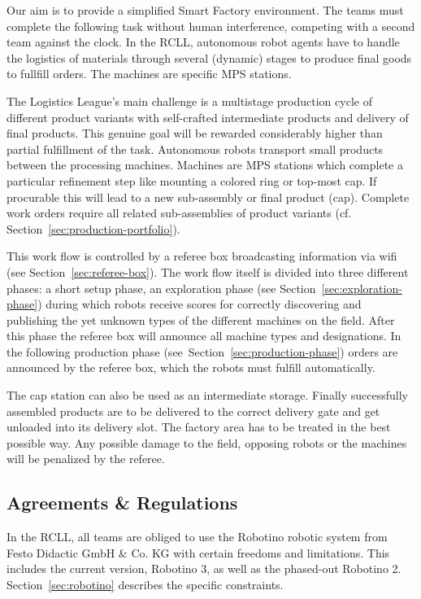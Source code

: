 \documentclass[12pt,twoside]{article}
\newcommand{\refsec}[1]{Section~\ref{#1}}
\begin{document}
Our aim is to provide a simplified Smart Factory environment. The
teams must complete the following task without human interference,
competing with a second team against the clock. In the RCLL,
autonomous robot agents have to handle the logistics of materials
through several (dynamic) stages to produce final goods to fullfill
orders. The machines are specific MPS stations.

The Logistics League's main challenge is a multistage production cycle
of different product variants with self-crafted intermediate products
and delivery of final products. This genuine goal will be rewarded
considerably higher than partial fulfillment of the task. Autonomous
robots transport small products between the processing
machines. Machines are MPS stations which complete a particular
refinement step like mounting a colored ring or top-most cap. If
procurable this will lead to a new sub-assembly or final product
(cap). Complete work orders require all related sub-assemblies of
product variants (cf.  \refsec{sec:production-portfolio}).

This work flow is controlled by a referee box broadcasting information
via wifi (see \refsec{sec:referee-box}). The work flow itself is
divided into three different phases: a short setup phase, an
exploration phase (see \refsec{sec:exploration-phase}) during which
robots receive scores for correctly discovering and publishing the yet
unknown types of the different machines on the field. After this phase
the referee box will announce all machine types and designations. In
the following production phase (see~\refsec{sec:production-phase})
orders are announced by the referee box, which the robots must fulfill
automatically.

The cap station can also be used as an intermediate storage. Finally
successfully assembled products are to be delivered to the correct
delivery gate and get unloaded into its delivery slot. The factory
area has to be treated in the best possible way. Any possible damage
to the field, opposing robots or the machines will be penalized by the
referee.

\subsection{Agreements \& Regulations}
\label{sec:agreements}
In the RCLL, all teams are obliged to use the Robotino robotic system
from Festo Didactic GmbH \& Co. KG with certain freedoms and
limitations. This includes the current version, Robotino 3, as well as
the phased-out Robotino 2. \refsec{sec:robotino} describes the
specific constraints.
\end{document}
